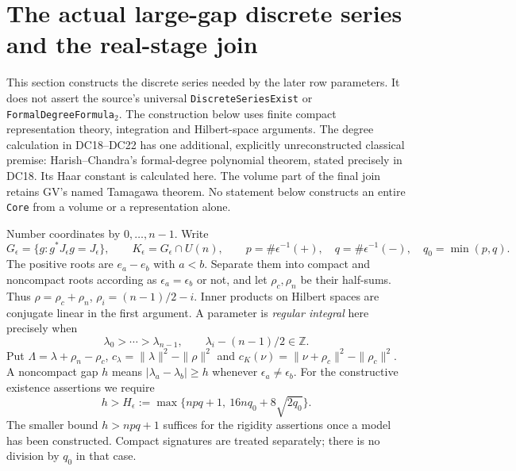 \section{The actual large-gap discrete series and the real-stage join}
\label{sec:discrete-series-core}

This section constructs the discrete series needed by the later row parameters.
It does not assert the source's universal \texttt{DiscreteSeriesExist} or
\texttt{FormalDegreeFormula\(_2\)}.  The construction below uses finite compact
representation theory, integration and Hilbert-space arguments.  The degree
calculation in DC18--DC22 has one additional, explicitly unreconstructed
classical premise: Harish--Chandra's formal-degree polynomial theorem, stated
precisely in DC18.  Its Haar constant is calculated here.  The volume part of
the final join retains GV's named Tamagawa theorem.  No statement below
constructs an entire \texttt{Core} from a volume or a representation alone.

Number coordinates by $0,\ldots,n-1$.  Write
\[
 G_\epsilon=\{g:g^*J_\epsilon g=J_\epsilon\},\qquad
 K_\epsilon=G_\epsilon\cap U(n),\qquad
 p=\#\epsilon^{-1}(+),\quad q=\#\epsilon^{-1}(-),\quad q_0=\min(p,q).
\]
The positive roots are $e_a-e_b$ with $a<b$.  Separate them into compact and
noncompact roots according as $\epsilon_a=\epsilon_b$ or not, and let
$\rho_c,\rho_n$ be their half-sums.  Thus
$\rho=\rho_c+\rho_n$, $\rho_i=(n-1)/2-i$.  Inner products on Hilbert spaces
are conjugate linear in the first argument.  A parameter is \emph{regular
integral} here precisely when
\[
 \lambda_0>\cdots>\lambda_{n-1},\qquad
 \lambda_i-(n-1)/2\in\mathbb Z.                                  \tag{DC.1}
\]
Put $\Lambda=\lambda+\rho_n-\rho_c$,
$c_\lambda=\|\lambda\|^2-\|\rho\|^2$ and
$c_K(\nu)=\|\nu+\rho_c\|^2-\|\rho_c\|^2$.  A noncompact gap $h$ means
$|\lambda_a-\lambda_b|\ge h$ whenever $\epsilon_a\ne\epsilon_b$.
For the constructive existence assertions we require
\[
 h>H_\epsilon:=\max\{npq+1,\ 16nq_0+8\sqrt{2q_0}\}.             \tag{DC.2}
\]
The smaller bound $h>npq+1$ suffices for the rigidity assertions once a
model has been constructed.  Compact signatures are treated separately;
there is no division by $q_0$ in that case.

